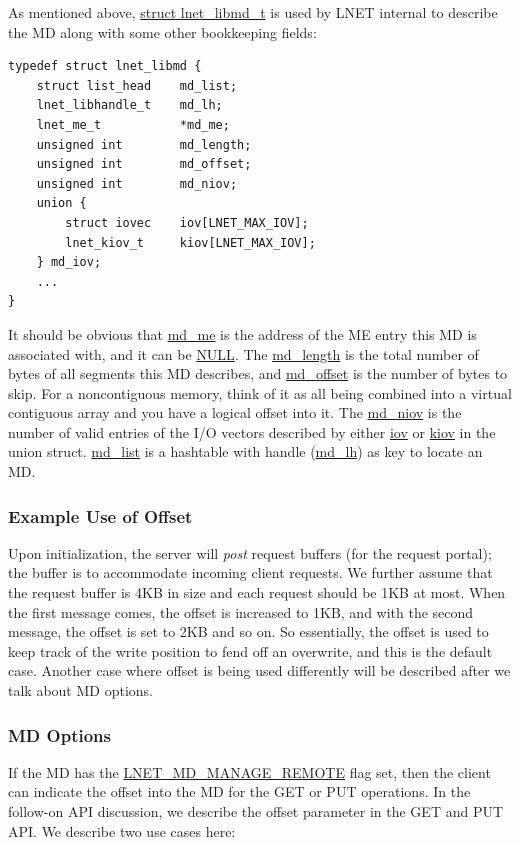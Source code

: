 As mentioned above, \url{struct lnet_libmd_t} is used by LNET internal to
describe the MD along with some other bookkeeping fields:

\begin{Verbatim}
typedef struct lnet_libmd {
    struct list_head    md_list;
    lnet_libhandle_t    md_lh;
    lnet_me_t           *md_me;
    unsigned int        md_length;
    unsigned int        md_offset;
    unsigned int        md_niov;
    union {
        struct iovec    iov[LNET_MAX_IOV];
        lnet_kiov_t     kiov[LNET_MAX_IOV];
    } md_iov;
    ...
}
\end{Verbatim}

It should be obvious that \url{md_me} is the address of the ME entry this MD is
associated with, and it can be \url{NULL}. The \url{md_length} is the total
number of bytes of all segments this MD describes, and \url{md_offset} is the
number of bytes to skip. For a noncontiguous memory, think of it as all being
combined into a virtual contiguous array and you have a logical offset into it.
The \url{md_niov} is the number of valid entries of the I/O vectors described
by either \url{iov} or \url{kiov} in the union struct. \url{md_list} is a
hashtable with handle (\url{md_lh}) as key to locate an MD.

\subsubsection*{Example Use of Offset}

Upon initialization, the server will \textit{post} request buffers (for the request
portal); the buffer is to accommodate incoming client requests. We further
assume that the request buffer is 4KB in size and each request should be 1KB at
most. When the first message comes, the offset is increased to 1KB, and with the
second message, the offset is set to 2KB and so on. So essentially, the offset
is used to keep track of the write position to fend off an overwrite, and this is
the default case. Another case where offset is being used differently will be
described after we talk about MD options.

\subsubsection*{MD Options}

If the MD has the \url{LNET_MD_MANAGE_REMOTE} flag set, then the client can
indicate the offset into the MD for the GET or PUT operations. In the follow-on
API discussion, we describe the offset parameter in the GET and PUT API.
We describe two use cases here: 

